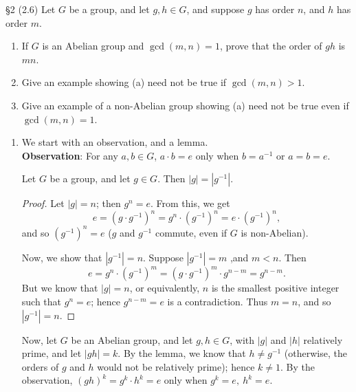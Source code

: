 \documentclass{homework}
\begin{document}
\begin{problem}{\S 2}
  (2.6) Let $G$ be a group, and let $g,h\in G$, and suppose $g$ has order $n$, and $h$ has order $m$.
  \begin{enumerate}[label=(\alph*)]
    \item If $G$ is an Abelian group and $\gcd{(m,n)}=1$, prove that the order of $gh$ is $mn$.
    \item Give an example showing (a) need not be true if  $\gcd{(m,n)}>1$.
    \item Give an example of a non-Abelian group showing (a) need not be true even if
      $\gcd{(m,n)}=1$.
  \end{enumerate}
\end{problem}
\begin{solution}
  \begin{enumerate}[label=(\alph*)]
    \item 
      We start with an observation, and a lemma.\\
      \textbf{Observation}: For any $a,b\in G$, $a\cdot b=e$ only when $b=a^{-1}$ or $a=b=e$.
      \begin{lemma}{}
        Let $G$ be a group, and let $g\in G$. Then $\left| g \right| =\left| g^{-1} \right| $.
      \end{lemma}
      \begin{proof}[Proof]
        Let $\left| g \right| =n$; then $g^{n}=e$. From this, we get \[
          e = \left( g\cdot g^{-1} \right)^{n}=g^{n}\cdot (g^{-1})^{n}=e\cdot (g^{-1})^{n}
        ,\] and so $(g^{-1})^{n}=e$ ($g$ and $g^{-1}$ commute, even if $G$ is non-Abelian).

        Now, we show that $\left| g^{-1} \right| =n$. Suppose $\left| g^{-1} \right| =m$ ,and $m<n$.
        Then \[
          e = g^{n}\cdot (g^{-1})^{m}=(g\cdot g^{-1})^{m}\cdot g^{n-m}=g^{n-m}
        .\] But we know that $\left| g \right| =n$, or equivalently, $n$ is the smallest positive
        integer such that $g^{n}=e$; hence $g^{n-m}=e$ is a contradiction. Thus $m=n$, and so $\left|
        g^{-1} \right| =n$.
      \end{proof}
      
      Now, let $G$ be an Abelian group, and let $g,h\in G$, with $\left| g \right| $ and $\left| h
      \right| $ relatively prime, and let $\left| gh \right| =k$. By the lemma, we know that $h\neq
      g^{-1}$ (otherwise, the orders of $g$ and $h$ would not be relatively prime); hence $k\neq 1$. By
      the observation, $(gh)^{k}=g^{k}\cdot h^{k}=e$ only when $g^{k}=e,\ h^{k}=e$.


\end{enumerate}
\end{solution}
\end{document}
